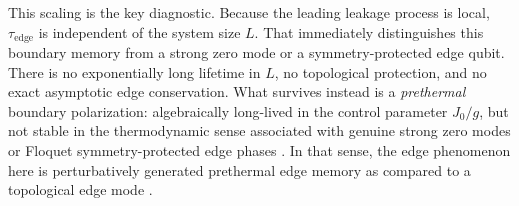 \documentclass[aps,prb,reprint,twocolumn,amsmath,amssymb,citeautoscript]{revtex4-2}
\begin{document}
This scaling is the key diagnostic. Because the leading leakage process is local, $\tau_{\mathrm{edge}}$ is independent of the system size $L$. That immediately distinguishes this boundary memory from a strong zero mode or a symmetry-protected edge qubit. There is no exponentially long lifetime in $L$, no topological protection, and no exact asymptotic edge conservation. What survives instead is a \textit{prethermal} boundary polarization: algebraically long-lived in the control parameter $J_0/g$, but not stable in the thermodynamic sense associated with genuine strong zero modes or Floquet symmetry-protected edge phases \cite{ElseFendleyKempNayak2017PRX,KempYaoLaumann2020PRL,ElseNayak2016PRB,VonKeyserlingkSondhi2016PRB1,PotterMorimotoVishwanath2016PRX,HarperRoyRudnerSondhi2020ARCMP}. In that sense, the edge phenomenon here is perturbatively generated prethermal edge memory as compared to a topological edge mode \cite{ParkerVasseurScaffidi2019PRL,YatesMitra2022CommunPhys,SurSen2024JPCM,Rakovszky2020PRBEdgeModes}.
\end{document}
